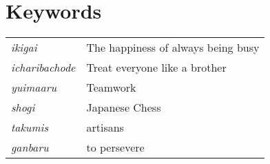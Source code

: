 \section*{Keywords}
\begin{tabular}{ l l }
    \textit{ikigai} & The happiness of always being busy \\ 
    \textit{icharibachode} & Treat everyone like a brother \\  
    \textit{yuimaaru} & Teamwork \\
    \textit{shogi} & Japanese Chess \\
    \textit{takumis} & artisans \\
    \textit{ganbaru} & to persevere \\
\end{tabular}
